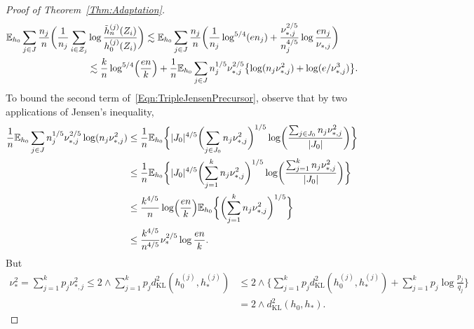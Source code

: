 \documentclass[a4paper,12pt]{article}
\newcommand{\blue}[1]{{\color{blue}#1}}
\begin{document}
\begin{proof}[Proof of Theorem~\ref{Thm:Adaptation}]
  \begin{align}
    \label{Eqn:TripleJensenPrecursor}
    \mathbb{E}_{h_0} \sum_{j \in J} \frac{n_j}{n}
    \biggl( \frac{1}{n_j} \sum_{i \in \mathcal{Z}_j} &\log \frac{\tilde{h}_n^{(j)}(Z_i) }{h_0^{(j)}(Z_i)} \biggr) 
    \lesssim \mathbb{E}_{h_0} \sum_{j \in J} \frac{n_j}{n} \biggl(\frac{1}{n_j} \log^{5/4} (en_j) +  \frac{\nu_{*,j}^{2/5}}{n_j^{4/5}}\log \frac{en_j}{\nu_{*,j}} \biggr) \nonumber \\
    &\lesssim \frac{k}{n} \log^{5/4} \Bigl(\frac{en}{k}\Bigr) + \frac{1}{n} \mathbb{E}_{h_0} \sum_{j \in J} n_j^{1/5} \nu_{*,j}^{2/5} \bigl\{\log (n_j \nu_{*,j}^2) + \log(e/\nu_{*,j}^3) \bigr\}.
  \end{align} 
To bound the second term of~\eqref{Eqn:TripleJensenPrecursor}, observe that by two applications of Jensen's inequality,
  \begin{align}
    \label{Eqn:Jensen1}
    \frac{1}{n} \mathbb{E}_{h_0} \sum_{j \in J} n_j^{1/5} \nu_{*,j}^{2/5} \log(n_j \nu_{*,j}^2)
    &\leq \frac{1}{n} \mathbb{E}_{h_0} \biggl\{|J_0|^{4/5}\biggl(
      \sum_{j\in J_0} n_j \nu_{*,j}^2 \biggr)^{1/5} \log \biggl(  \frac{\sum_{j \in J_0} n_j \nu_{*,j}^2 }{|J_0|} \biggr)\biggr\} \nonumber \\
&\leq \frac{1}{n} \mathbb{E}_{h_0} \biggl\{|J_0|^{4/5}\biggl(
      \sum_{j=1}^k n_j \nu_{*,j}^2 \biggr)^{1/5} \log \biggl(  \frac{\sum_{j =1}^k n_j \nu_{*,j}^2 }{|J_0|} \biggr)\biggr\} \nonumber \\
&\leq \frac{k^{4/5}}{n} \log \Bigl(\frac{en}{k}\Bigr)\mathbb{E}_{h_0} \biggl\{\biggl(
      \sum_{j=1}^k n_j \nu_{*,j}^2 \biggr)^{1/5} \biggr\} \nonumber \\
    &\leq \frac{k^{4/5}}{n^{4/5}} \nu_*^{2/5} \log \frac{en}{k}. %
  \end{align}
But
\begin{align}
\label{Eq:nustar}
\nu_*^2 = \sum_{j=1}^k p_j \nu_{*,j}^2 \leq 2 \wedge \sum_{j=1}^k p_j d_{\mathrm{KL}}^2(h_0^{(j)}, h_*^{(j)}) &\leq 2 \wedge \biggl\{\sum_{j=1}^k p_j d_{\mathrm{KL}}^2(h_0^{(j)}, h_*^{(j)}) + \sum_{j=1}^k p_j \log \frac{p_j}{q_j}\biggr\} \nonumber \\
&= 2 \wedge d_{\mathrm{KL}}^2(h_0,h_*).
\end{align}

\end{proof}
\end{document}
